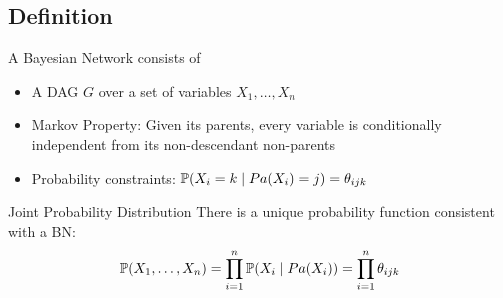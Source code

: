 \subsection{Definition}
	\begin{frame}
		A Bayesian Network consists of
		\begin{itemize}
			\item A DAG $G$ over a set of variables $X_1 , \ldots , X_n$
			\item \alert{Markov Property}: Given its parents, every variable is conditionally independent from its non-descendant non-parents
			\item \alert{Probability constraints}: $\P( X_i = k \mid {Pa}( X_i ) = j ) = \theta_{ijk}$
		\end{itemize}
		\begin{block}{Joint Probability Distribution}
			There is a unique probability function consistent with a BN:
			\[ \P( X_1 , \ldots , X_n ) = \prod_{i=1}^n \P( X_i \mid {Pa}( X_i ) ) = \prod_{i=1}^n \theta_{ijk} \]
		\end{block}
	\end{frame}